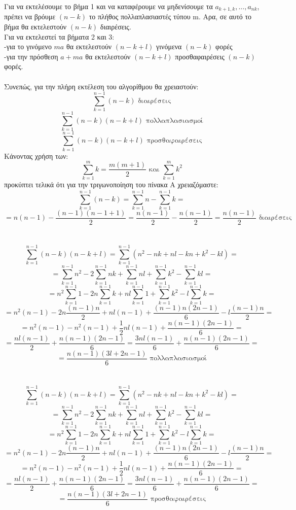 \documentclass[12pt]{article}
\begin{document}
Για να εκτελέσουμε το βήμα 1 και να καταφέρουμε να μηδενίσουμε τα $a_{k+1,k},...,a_{nk}$, πρέπει να βρόυμε $(n-k)$ το πλήθος πολλαπλασιαστές τύπου m. Αρα, σε αυτό το βήμα θα εκτελεστούν $(n-k)$ διαιρέσεις. \\
Για να εκτελεστεί τα βήματα 2 και 3: \\
-για το γινόμενο $ma$ θα εκτελεστούν $(n-k+l)$ γινόμενα $(n-k)$ φορές    \\
-για την πρόσθεση $a+ma$ θα εκτελεστούν $(n-k+l)$ προσθαφαιρέσεις $(n-k)$ φορές. \\ \\
Συνεπώς, για την πλήρη εκτέλεση του αλγορίθμου θα χρειαστούν:
$$ \sum_{k=1}^{n-1} {(n-k)}	\mbox{	διαιρέσεις}$$
$$\sum_{k=1}^{n-1} {(n-k)(n-k+l)} \mbox{	πολλαπλασιασμοί} $$ 
$$\sum_{k=1}^{n-1} {(n-k)(n-k+l)} \mbox{	προσθαφαιρέσεις} $$  
Κάνοντας χρήση των: \\
$$
\sum_{k=1}^{m}k = \frac{m(m+1)}{2} \mbox{ και } \sum_{k=1}^{m}k^2
$$
προκύπτει τελικά ότι για την τριγωνοποίηση του πίνακα Α χρειαζόμαστε:
$$ \sum_{k=1}^{n-1} {(n-k)} = \sum_{k=1}^{n-1}n - \sum_{k=1}^{n-1}k = $$
$$ = n(n-1) - \frac{(n-1)(n-1+1)}{2} = \frac{n(n-1)}{2} - \frac{n(n-1)}{2} = \frac{n(n-1)}{2}	\mbox{	διαιρέσεις}$$ \\ \\
$$\sum_{k=1}^{n-1} {(n-k)(n-k+l)} = \sum_{k=1}^{n-1}{(n^2-nk+nl-kn+k^2-kl)} = $$
$$ = \sum_{k=1}^{n-1}n^2 - 2\sum_{k=1}^{n-1}{nk} + \sum_{k=1}^{n-1}{nl} + \sum_{k=1}^{n-1}k^2 - \sum_{k=1}^{n-1}{kl} = $$
$$ = n^2\sum_{k=1}^{n-1}1 -2n\sum_{k=1}^{n-1}k +nl\sum_{k=1}^{n-1}1 + \sum_{k=1}^{n-1}k^2 - l\sum_{k=1}^{n-1}k = $$
$$ = n^2(n-1) - 2n\frac{(n-1)n}{2} + nl(n-1) + \frac{(n-1)n(2n-1)}{6} - l\frac{(n-1)n}{2} = $$
$$ = n^2(n-1) - n^2(n-1) + \frac{1}{2}nl(n-1) + \frac{n(n-1)(2n-1)}{6} = $$
$$ = \frac{nl(n-1)}{2} + \frac{n(n-1)(2n-1)}{6} = \frac{3nl(n-1)}{6} + \frac{n(n-1)(2n-1)}{6} = $$ $$ = \frac{n(n-1)(3l+2n-1)}{6} \mbox{	πολλαπλασιασμοί} $$ \\ \\ 
$$\sum_{k=1}^{n-1} {(n-k)(n-k+l)} = \sum_{k=1}^{n-1}{(n^2-nk+nl-kn+k^2-kl)} = $$
$$ = \sum_{k=1}^{n-1}n^2 - 2\sum_{k=1}^{n-1}{nk} + \sum_{k=1}^{n-1}{nl} + \sum_{k=1}^{n-1}k^2 - \sum_{k=1}^{n-1}{kl} = $$
$$ = n^2\sum_{k=1}^{n-1}1 -2n\sum_{k=1}^{n-1}k +nl\sum_{k=1}^{n-1}1 + \sum_{k=1}^{n-1}k^2 - l\sum_{k=1}^{n-1}k = $$
$$ = n^2(n-1) - 2n\frac{(n-1)n}{2} + nl(n-1) + \frac{(n-1)n(2n-1)}{6} - l\frac{(n-1)n}{2} = $$
$$ = n^2(n-1) - n^2(n-1) + \frac{1}{2}nl(n-1) + \frac{n(n-1)(2n-1)}{6} = $$
$$ = \frac{nl(n-1)}{2} + \frac{n(n-1)(2n-1)}{6} = \frac{3nl(n-1)}{6} + \frac{n(n-1)(2n-1)}{6} = $$ $$ = \frac{n(n-1)(3l+2n-1)}{6} \mbox{	προσθαφαιρέσεις} $$ \\ \\ 
\end{document}
